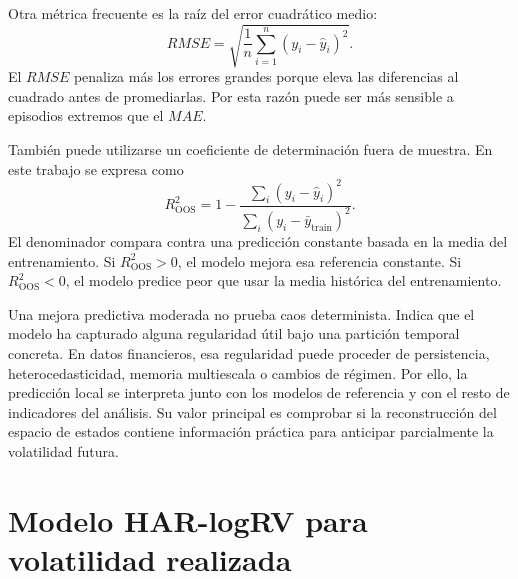 Otra métrica frecuente es la raíz del error cuadrático medio:
\begin{equation}
    RMSE=\sqrt{\frac{1}{n}\sum_{i=1}^{n}(y_i-\hat{y}_i)^2}.
\end{equation}
El \(RMSE\) penaliza más los errores grandes porque eleva las diferencias al cuadrado antes de promediarlas. Por esta razón puede ser más sensible a episodios extremos que el \(MAE\).

También puede utilizarse un coeficiente de determinación fuera de muestra. En este trabajo se expresa como
\begin{equation}
    R^2_{\mathrm{OOS}}
    =
    1-
    \frac{\sum_i(y_i-\hat{y}_i)^2}
    {\sum_i(y_i-\bar{y}_{\mathrm{train}})^2}.
\end{equation}
El denominador compara contra una predicción constante basada en la media del entrenamiento. Si \(R^2_{\mathrm{OOS}}>0\), el modelo mejora esa referencia constante. Si \(R^2_{\mathrm{OOS}}<0\), el modelo predice peor que usar la media histórica del entrenamiento.

Una mejora predictiva moderada no prueba caos determinista. Indica que el modelo ha capturado alguna regularidad útil bajo una partición temporal concreta. En datos financieros, esa regularidad puede proceder de persistencia, heterocedasticidad, memoria multiescala o cambios de régimen. Por ello, la predicción local se interpreta junto con los modelos de referencia y con el resto de indicadores del análisis. Su valor principal es comprobar si la reconstrucción del espacio de estados contiene información práctica para anticipar parcialmente la volatilidad futura.

\section{Modelo HAR-logRV para volatilidad realizada}\label{sec:har-logrv-teoria}

